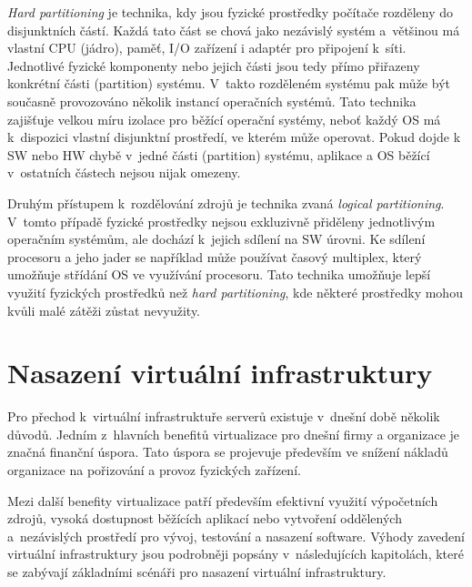 \textit{Hard partitioning} je technika, kdy jsou fyzické prostředky počítače rozděleny do disjunktních částí. Každá tato část
se chová jako nezávislý systém a~většinou má vlastní CPU (jádro), paměť, I/O zařízení i adaptér pro připojení k~síti. Jednotlivé
fyzické komponenty nebo jejich části jsou tedy přímo přiřazeny konkrétní části (partition) systému. V~takto rozděleném systému
pak může být současně provozováno několik instancí operačních systémů. Tato technika zajišťuje velkou míru izolace pro běžící operační
systémy, neboť každý OS má k~dispozici vlastní disjunktní prostředí, ve kterém může operovat. Pokud dojde k SW nebo HW chybě
v~jedné části (partition) systému, aplikace a OS běžící v~ostatních částech nejsou nijak omezeny.

Druhým přístupem k~rozdělování zdrojů je technika zvaná \textit{logical partitioning}. V~tomto případě fyzické prostředky nejsou
exkluzivně přiděleny jednotlivým operačním systémům, ale dochází k~jejich sdílení na SW úrovni. Ke sdílení procesoru a jeho jader
se například může používat časový multiplex, který umožňuje střídání OS ve využívání procesoru. Tato technika umožňuje lepší
využití fyzických prostředků než \textit{hard partitioning}, kde některé prostředky mohou kvůli malé zátěži zůstat nevyužity.
\section{Nasazení virtuální infrastruktury}
\label{chapter:virtualization:deployment}
Pro přechod k~virtuální infrastruktuře serverů existuje v~dnešní době několik důvodů. Jedním z~hlavních benefitů virtualizace
pro dnešní firmy a organizace je značná finanční úspora. Tato úspora se projevuje především ve snížení nákladů organizace na
pořizování a provoz fyzických zařízení. 

Mezi další benefity virtualizace patří především efektivní využití výpočetních zdrojů, vysoká dostupnost běžících aplikací nebo
vytvoření oddělených a~nezávislých prostředí pro vývoj, testování a nasazení software. Výhody zavedení virtuální infrastruktury
jsou podrobněji popsány v~následujících kapitolách, které se zabývají základními scénáři pro nasazení virtuální infrastruktury.

